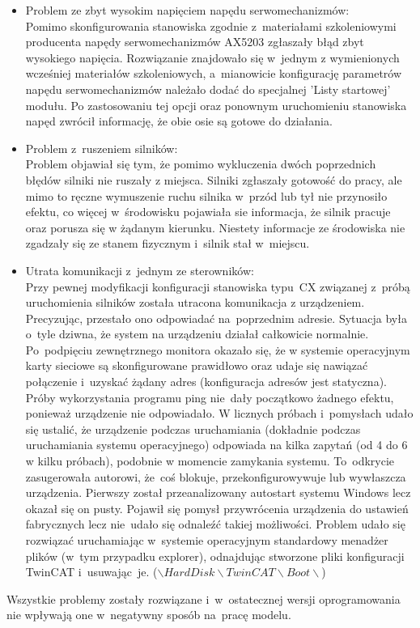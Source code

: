 \begin{itemize}
\item Problem ze zbyt wysokim napięciem napędu serwomechanizmów:\\[1mm]
Pomimo skonfigurowania stanowiska zgodnie z~materiałami szkoleniowymi producenta \cite{kurs2, silniki} napędy serwomechanizmów AX5203 zgłaszały błąd zbyt wysokiego napięcia. Rozwiązanie znajdowało się w~jednym z wymienionych wcześniej materiałów szkoleniowych, a~mianowicie konfigurację parametrów napędu serwomechanizmów należało dodać do specjalnej 'Listy startowej' modułu. Po zastosowaniu tej opcji oraz ponownym uruchomieniu stanowiska napęd zwrócił informację, że obie osie są gotowe do działania.

\item Problem z~ruszeniem silników:\\[1mm]
Problem objawiał się tym, że pomimo wykluczenia dwóch poprzednich błędów silniki nie ruszały z miejsca. Silniki zgłaszały gotowość do pracy, ale mimo to ręczne wymuszenie ruchu silnika w~przód lub tył nie przynosiło efektu, co więcej w~środowisku pojawiała sie informacja, że silnik pracuje oraz porusza się w żądanym kierunku. Niestety informacje ze środowiska nie zgadzały się ze stanem fizycznym i~silnik stał w~miejscu.

\item Utrata komunikacji z~jednym ze sterowników:\\[1mm]
Przy pewnej modyfikacji konfiguracji stanowiska typu~CX związanej z~próbą uruchomienia silników została utracona komunikacja z urządzeniem. Precyzując, przestało ono odpowiadać na~poprzednim adresie. Sytuacja była o~tyle dziwna, że system na urządzeniu działał całkowicie normalnie. Po~podpięciu zewnętrznego monitora okazało się, że w systemie operacyjnym karty sieciowe są skonfigurowane prawidłowo oraz udaje się nawiązać połączenie i~uzyskać żądany adres (konfiguracja adresów jest statyczna). Próby wykorzystania programu ping nie~dały początkowo żadnego efektu, ponieważ urządzenie nie odpowiadało. W licznych próbach i~pomysłach udało się ustalić, że urządzenie podczas uruchamiania (dokładnie podczas uruchamiania systemu operacyjnego) odpowiada na kilka zapytań (od 4 do 6 w kilku próbach), podobnie w momencie zamykania systemu. To~odkrycie zasugerowała autorowi, że~coś blokuje, przekonfigurowywuje lub wywłaszcza urządzenia. Pierwszy został przeanalizowany autostart systemu Windows lecz okazał się on pusty. Pojawił się pomysł przywrócenia urządzenia do ustawień fabrycznych lecz nie~udało się odnaleźć takiej możliwości. Problem udało się rozwiązać uruchamiając w~systemie operacyjnym standardowy menadżer plików (w~tym przypadku explorer), odnajdując stworzone pliki konfiguracji TwinCAT i~usuwając~je. ($\backslash Hard Disk\backslash TwinCAT\backslash Boot\backslash$)

\end{itemize}
\indent
\indent Wszystkie problemy zostały rozwiązane i~w~ostatecznej wersji oprogramowania nie wpływają one w~negatywny sposób na~pracę modelu.
